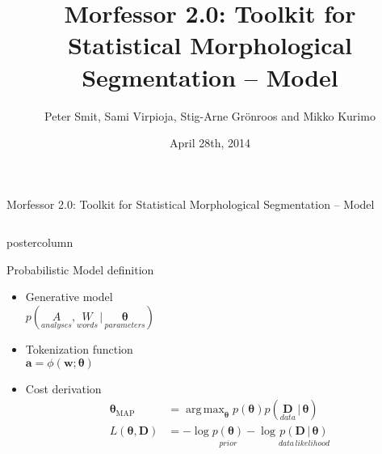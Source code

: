 \documentclass[final]{beamer} %
\title{Morfessor 2.0: Toolkit for Statistical Morphological Segmentation -- Model}
\author{Peter Smit, Sami Virpioja, Stig-Arne Gr\"onroos and Mikko Kurimo}
\institute[Aalto University]{Aalto University}
\date{April 28th, 2014}
\DeclareMathOperator*{\argmax}{arg\,max}
\newcommand{\seq}[1]{\boldsymbol{#1}}
\newcommand{\txt}[1]{\textrm{#1}}
\newcommand{\cost}{L}
\newcommand{\params}{\boldsymbol{\theta}}
\newcommand{\data}{\seq{D}}
\newcommand{\token}{\phi}
\newcommand{\vb}{\,|\,}
\begin{document}
  \begin{frame}{Morfessor 2.0: Toolkit for Statistical Morphological Segmentation -- Model} 
\begin{columns}

\begin{column}{.4\textwidth}
%            
%

      \begin{beamercolorbox}[center,wd=\textwidth]{postercolumn}
 \begin{block}{Probabilistic Model definition}
              \begin{itemize}
              \item Generative model\\
$p(\underset{analyses}{A}, \underset{words}{W} \vb \underset{parameters}{\params})$
		\item Tokenization function\\
 $\seq{a} = \token(\seq{w}; \params)$
		\item Cost derivation\\
\begin{align*}\params_{\txt{MAP}}%
&= \argmax_{\params} p(\params) p(\underset{data}{\data} \vb \params)\\
\cost(\params, \data) &= -\log \underset{prior}{p(\params)} - \log \underset{data\,likelihood}{p(\data \vb \params)}
\end{align*}
              \end{itemize}              
            \end{block}
            
	\end{beamercolorbox}


\end{column}
\end{columns}
\end{frame}
\end{document}
